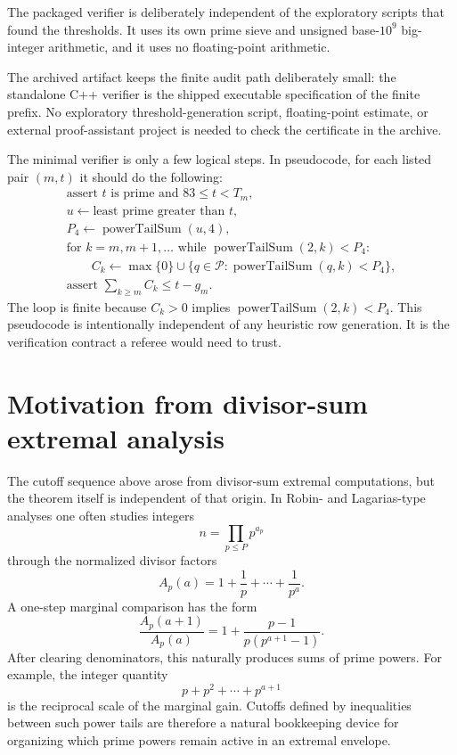 \documentclass[11pt]{article}
\newcommand{\Pow}{\operatorname{powerTailSum}}
\newcommand{\Primes}{\mathcal P}
\begin{document}
The packaged verifier is deliberately independent of the exploratory scripts
that found the thresholds.  It uses its own prime sieve and unsigned
base-\(10^9\) big-integer arithmetic, and it uses no floating-point
arithmetic.

The archived artifact keeps the finite audit path deliberately small: the
standalone C++ verifier is the shipped executable specification of the finite
prefix.  No exploratory threshold-generation script, floating-point estimate,
or external proof-assistant project is needed to check the certificate in the
archive.

The minimal verifier is only a few logical steps.  In pseudocode, for each
listed pair \((m,t)\) it should do the following:
\[
\begin{array}{l}
\text{assert } t \text{ is prime and } 83\le t<T_m,\\
u\leftarrow\text{least prime greater than }t,\\
P_4\leftarrow \Pow(u,4),\\
\text{for } k=m,m+1,\ldots\text{ while }\Pow(2,k)<P_4:\\
\qquad C_k\leftarrow\max\{0\}\cup\{q\in\Primes:\Pow(q,k)<P_4\},\\
\text{assert } \sum_{k\ge m}C_k\le t-g_m.
\end{array}
\]
The loop is finite because \(C_k>0\) implies \(\Pow(2,k)<P_4\).  This
pseudocode is intentionally independent of any heuristic row generation.  It
is the verification contract a referee would need to trust.

\section{Motivation from divisor-sum extremal analysis}

The cutoff sequence above arose from divisor-sum extremal computations, but
the theorem itself is independent of that origin.  In Robin- and
Lagarias-type analyses one often studies integers
\[
  n=\prod_{p\le P}p^{a_p}
\]
through the normalized divisor factors
\[
  A_p(a)=1+\frac1p+\cdots+\frac1{p^a}.
\]
A one-step marginal comparison has the form
\[
  \frac{A_p(a+1)}{A_p(a)}
  =
  1+\frac{p-1}{p(p^{a+1}-1)}.
\]
After clearing denominators, this naturally produces sums of prime powers.
For example, the integer quantity
\[
  p+p^2+\cdots+p^{a+1}
\]
is the reciprocal scale of the marginal gain.  Cutoffs defined by inequalities
between such power tails are therefore a natural bookkeeping device for
organizing which prime powers remain active in an extremal envelope.
\end{document}
